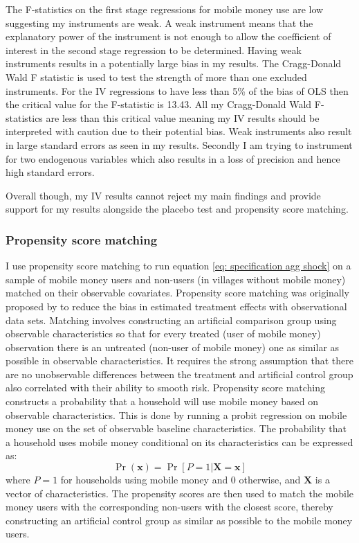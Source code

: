 The F-statistics on the first stage regressions for mobile money use are low suggesting my instruments are weak. A weak instrument means that the explanatory power of the instrument is not enough to allow the coefficient of interest in the second stage regression to be determined. Having weak instruments results in a potentially large bias in my results. The Cragg-Donald Wald F statistic is used to test the strength of more than one excluded instruments. For the IV regressions to have less than 5\% of the bias of OLS then the critical value for the F-statistic is 13.43. All my Cragg-Donald Wald F-statistics are less than this critical value meaning my IV results should be interpreted with caution due to their potential bias. Weak instruments also result in large standard errors as seen in my results. Secondly I am trying to instrument for two endogenous variables which also results in a loss of precision and hence high standard errors. 

Overall though, my IV results cannot reject my main findings and provide support for my results alongside the placebo test and propensity score matching. 

\subsubsection{Propensity score matching}
I use propensity score matching to run equation \eqref{eq: specification agg shock} on a sample of mobile money users and non-users (in villages without mobile money) matched on their observable covariates. Propensity score matching was originally proposed by \cite{rosenbaum1983} to reduce the bias in estimated treatment effects with observational data sets. Matching involves constructing an artificial comparison group using observable characteristics so that for every treated (user of mobile money) observation there is an untreated (non-user of mobile money) one as similar as possible in observable characteristics. It requires the strong assumption that there are no unobservable differences between the treatment and artificial control group also correlated with their ability to smooth risk.    
Propensity score matching constructs a probability that a household will use mobile money based on observable characteristics. This is done by running a probit regression on mobile money use on the set of observable baseline characteristics. The probability that a household uses mobile money conditional on its characteristics can be expressed as: 
\begin{equation}
\Pr(\mathbf{x})=\Pr[P=1|\mathbf{X=x}]
\end{equation}
where $P=1$ for households using mobile money and 0 otherwise, and $\mathbf{X}$ is a vector of characteristics. The propensity scores are then used to match the mobile money users with the corresponding non-users with the closest score, thereby constructing an artificial control group as similar as possible to the mobile money users. 


